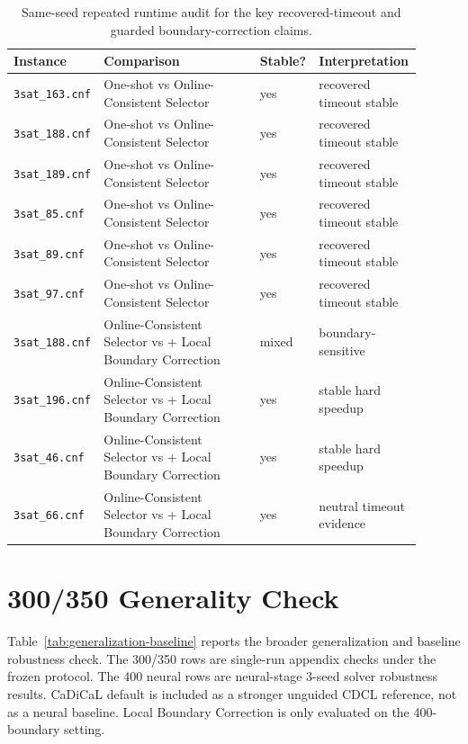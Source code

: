\documentclass[11pt]{article}
\begin{document}
\begin{table}[h]
\centering
\caption{Same-seed repeated runtime audit for the key recovered-timeout and guarded boundary-correction claims.}
\label{tab:repeated-runtime-audit}
\begin{tabular}{p{0.18\linewidth}p{0.38\linewidth}p{0.10\linewidth}p{0.24\linewidth}}
\toprule
Instance & Comparison & Stable? & Interpretation \\
\midrule
\texttt{3sat\_163.cnf} & One-shot vs Online-Consistent Selector & yes & recovered timeout stable \\
\texttt{3sat\_188.cnf} & One-shot vs Online-Consistent Selector & yes & recovered timeout stable \\
\texttt{3sat\_189.cnf} & One-shot vs Online-Consistent Selector & yes & recovered timeout stable \\
\texttt{3sat\_85.cnf} & One-shot vs Online-Consistent Selector & yes & recovered timeout stable \\
\texttt{3sat\_89.cnf} & One-shot vs Online-Consistent Selector & yes & recovered timeout stable \\
\texttt{3sat\_97.cnf} & One-shot vs Online-Consistent Selector & yes & recovered timeout stable \\
\texttt{3sat\_188.cnf} & Online-Consistent Selector vs + Local Boundary Correction & mixed & boundary-sensitive \\
\texttt{3sat\_196.cnf} & Online-Consistent Selector vs + Local Boundary Correction & yes & stable hard speedup \\
\texttt{3sat\_46.cnf} & Online-Consistent Selector vs + Local Boundary Correction & yes & stable hard speedup \\
\texttt{3sat\_66.cnf} & Online-Consistent Selector vs + Local Boundary Correction & yes & neutral timeout evidence \\
\bottomrule
\end{tabular}
\end{table}

\section{300/350 Generality Check}

Table~\ref{tab:generalization-baseline} reports the broader generalization and baseline robustness check. The 300/350 rows are single-run appendix checks under the frozen protocol. The 400 neural rows are neural-stage 3-seed solver robustness results. CaDiCaL default is included as a stronger unguided CDCL reference, not as a neural baseline. Local Boundary Correction is only evaluated on the 400-boundary setting.
\end{document}
